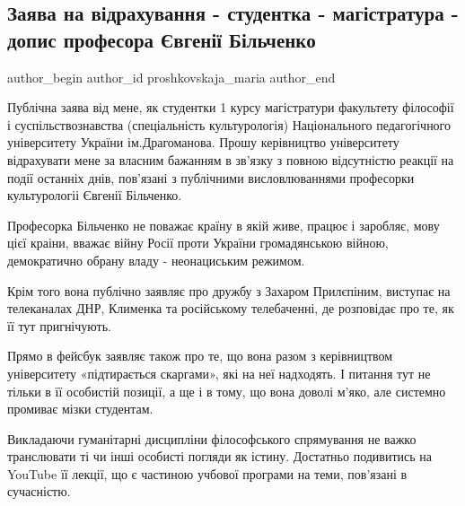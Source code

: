  
 
 
 
 
 
\subsection{Заява на відрахування - студентка - магістратура - допис професора Євгенії Більченко}
\label{sec:25_01_2021.fb.proshkovskaja_maria.1.bilchenko_zajavlenie_studentka_magistratura}
 
\ifcmt
 author_begin
   author_id proshkovskaja_maria
 author_end
\fi

Публічна заява від мене, як студентки 1 курсу магістратури  факультету
філософії і суспільствознавства (спеціальність культурологія) Національного
педагогічного університету України ім.Драгоманова. Прошу керівництво
університету відрахувати мене за власним бажанням в зв’язку з повною
відсутністю реакції на події останніх днів, пов’язані з публічними
висловлюваннями професорки культурологіі Євгенії Більченко. 

Професорка Більченко не поважає країну в якій живе, працює і заробляє, мову
цієї краіни, вважає війну Росії проти України громадянською війною,
демократично обрану владу - неонациським режимом. 

Крім того вона публічно заявляє про дружбу з Захаром Прилєпіним, виступає на
телеканалах ДНР, Клименка та російському телебаченні, де розповідає про те, як
її тут пригнічують. 

Прямо в фейсбук заявляє також про те, що вона разом з керівництвом університету
«підтирається скаргами», які на неї надходять. І питання тут не тільки в її
особистій позиції, а ще і в тому, що вона доволі м’яко, але системно промиває
мізки студентам. 

Викладаючи гуманітарні дисципліни філософського спрямування не
важко транслювати ті чи інші особисті погляди як істину. Достатньо подивитись
на YouTube її лекції, що є частиною учбової програми на теми, пов’язані в
сучасністю. 

